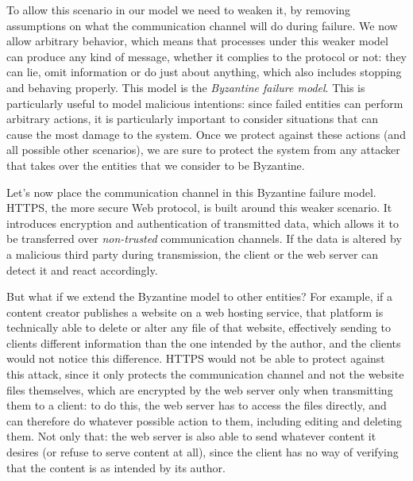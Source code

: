 \documentclass[mscthesis]{usiinfthesis}
\begin{document}
To allow this scenario in our model we need to weaken it, by removing assumptions on what the communication channel will do during failure. We now allow arbitrary behavior, which means that processes under this weaker model can produce any kind of message, whether it complies to the protocol or not: they can lie, omit information or do just about anything\footnotemark{}, which also includes stopping and behaving properly. This model is the \emph{Byzantine failure model}.
This is particularly useful to model malicious intentions: since failed entities can perform arbitrary actions, it is particularly important to consider situations that can cause the most damage to the system. Once we protect against these actions (and all possible other scenarios), we are sure to protect the system from any attacker that takes over the entities that we consider to be Byzantine.

Let's now place the communication channel in this Byzantine failure model.
HTTPS, the more secure Web protocol, is built around this weaker scenario. It introduces encryption and authentication of transmitted data, which allows it to be transferred over \textit{non-trusted} communication channels.
If the data is altered by a malicious third party during transmission, the client or the web server can detect it and react accordingly.

But what if we extend the Byzantine model to other entities? For example, if a content creator publishes a website on a web hosting service, that platform is technically able to delete or alter any file of that website, effectively sending to clients different information than the one intended by the author, and the clients would not notice this difference. HTTPS would not be able to protect against this attack, since it only protects the communication channel and not the website files themselves, which are encrypted by the web server only when transmitting them to a client: to do this, the web server has to access the files directly, and can therefore do whatever possible action to them, including editing and deleting them. Not only that: the web server is also able to send whatever content it desires (or refuse to serve content at all), since the client has no way of verifying that the content is as intended by its author.
\end{document}

